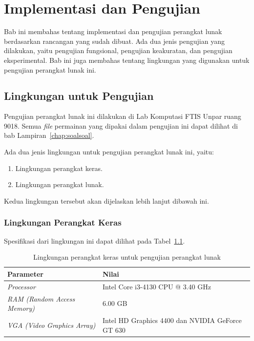 \chapter{Implementasi dan Pengujian}
\label{chap:implementasipengujian}

Bab ini membahas tentang implementasi dan pengujian perangkat lunak berdasarkan rancangan yang sudah dibuat. Ada dua jenis pengujian yang dilakukan, yaitu pengujian fungsional, pengujian keakuratan, dan pengujian eksperimental. Bab ini juga membahas tentang lingkungan yang digunakan untuk pengujian perangkat lunak ini.

\section{Lingkungan untuk Pengujian}
\label{sec:lingkunganpengujian}

Pengujian perangkat lunak ini dilakukan di Lab Komputasi FTIS Unpar ruang 9018. Semua \textit{file} permainan yang dipakai dalam pengujian ini dapat dilihat di bab Lampiran~\ref{chap:soalsoal}. 

Ada dua jenis lingkungan untuk pengujian perangkat lunak ini, yaitu:

\begin{enumerate}
\item Lingkungan perangkat keras.
\item Lingkungan perangkat lunak.
\end{enumerate}

Kedua lingkungan tersebut akan dijelaskan lebih lanjut dibawah ini.

\subsection{Lingkungan Perangkat Keras}
\label{sec:lingkungankeras}

Spesifikasi dari lingkungan ini dapat dilihat pada Tabel~\ref{tab:lingkunganpk}.

\begin{table}
\centering
\captionsetup{justification=centering}
\caption[Lingkungan perangkat keras untuk pengujian perangkat lunak]{Lingkungan perangkat keras untuk pengujian perangkat lunak}
\begin{tabular}{| l | l |}
\hline
Parameter & Nilai \\
\hline \hline
\textit{Processor} & Intel Core i3-4130 CPU @ 3.40 GHz \\
\hline
\textit{RAM (Random Access Memory)} & 6.00 GB \\
\hline
\textit{VGA (Video Graphics Array)} & Intel HD Graphics 4400 dan NVIDIA GeForce GT 630 \\
\hline
\end{tabular}
\label{tab:lingkunganpk}
\end{table}

